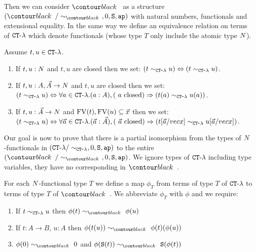 Then we can consider $\systemT$ as a structure $(\systemT/\sim_{\systemT}, 0, \Succ, \ap)$
with natural numbers, functionals and extensional equality. 
In the same way we define an equivalence relation on terms of ${ {\tt CT} \mbox{-} \lambda}$ which denote functionals
(whose type $T$ only include the atomic type ${N}$). 


\begin{definition}
Assume $t,u \in { {\tt CT} \mbox{-} \lambda}$.
\begin{enumerate}
\item
If $t,u:{N}$ and $t,u$ are closed then we set: 
$(t \sim_{{ {\tt CT} \mbox{-} \lambda}} u) \Leftrightarrow  (t \sim_{{ {\tt CT} \mbox{-} \lambda}} u)$.
\item
If $t,u:A,\vec{A}\rightarrow{N}$ and $t,u$ are closed then we set: 
$(t \sim_{{ {\tt CT} \mbox{-} \lambda}} u) \Leftrightarrow  
\forall a \in { {\tt CT} \mbox{-} \lambda}. (a:A), (\mbox{ $a$ closed}) \Rightarrow (t(a) \sim_{{ {\tt CT} \mbox{-} \lambda}} u(a))$.
\item
If $t,u:\vec{A}\rightarrow{N}$ and ${{\rm FV}}(t), {{\rm FV}}(u) \subseteq \vec{x}$ then we set:
$(t \sim_{{ {\tt CT} \mbox{-} \lambda}} u) 
\Leftrightarrow  
\forall \vec{a} \in { {\tt CT} \mbox{-} \lambda}. 
(\vec{a}:\vec{A}), (\mbox{ $\vec{a}$ closed})  \Rightarrow (t[\vec{a}/vec{x}] \sim_{{ {\tt CT} \mbox{-} \lambda}} u[\vec{a}/vec{x}])$.
\end{enumerate}
\end{definition}

Our goal is now to prove that there is a partial isomorphism from the types of ${N}$-functionals in 
$({ {\tt CT} \mbox{-} \lambda}/\sim_{{ {\tt CT} \mbox{-} \lambda}}, 0, {\tt S}, {\tt ap})$ to the entire
$(\systemT/\sim_{\systemT}, 0, \Succ, \ap)$.
We ignore types of ${ {\tt CT} \mbox{-} \lambda}$ including type variables, they have no corresponding in $\systemT$.

For each ${N}$-functional type $T$ we define a map $\phi_T$ from terms of type $T$ of ${ {\tt CT} \mbox{-} \lambda}$
to terms of type $T$ of $\systemT$. We abbreviate $\phi_T$ with $\phi$ and we require:

\begin{enumerate}
\item
If $t \sim_{{ {\tt CT} \mbox{-} \lambda}} u$ then $\phi(t) \sim_{\systemT} \phi(u)$

\item
If $t: A \rightarrow B$, $u:A$ then $\phi(t(u)) \sim_{\systemT} \phi(t)(\phi(u))$

\item
$\phi(0) \sim_{\systemT} 0$ and
$\phi(\Succ(t)) \sim_{\systemT} \Succ(\phi(t))$

\end{enumerate}

